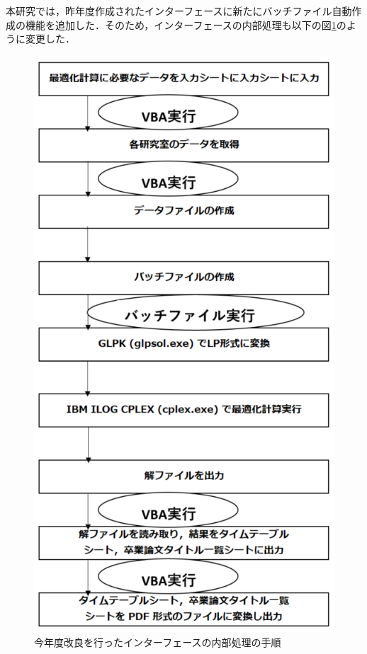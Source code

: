 \documentclass[a4paper,12pt,fleqn]{jarticle}
\begin{document}
本研究では，昨年度作成されたインターフェースに新たにバッチファイル自動作成の機能を追加した．そのため，インターフェースの内部処理も以下の図\ref{fig:FlowChart}のように変更した．
\begin{figure}[H]
  \begin{center}
    \includegraphics[scale=1.0]{FloxChart.png}
    \caption{今年度改良を行ったインターフェースの内部処理の手順}
    \label{fig:FlowChart}
  \end{center}
\end{figure}
\end{document}
